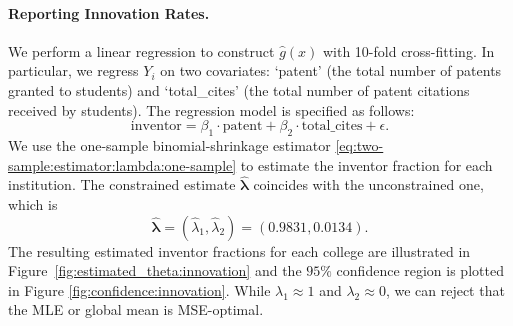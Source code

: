 \documentclass[12pt,letterpaper]{article}
\begin{document}
\paragraph{Reporting Innovation Rates.} %
We perform a linear regression to construct $\hat{g}(x)$ with 10-fold cross-fitting. In particular, we regress $Y_i$ on two covariates: `patent' (the total number of patents granted to students) and `total\_cites' (the total number of patent citations received by students). The regression model is specified as follows:
$$\textrm{inventor}=\beta_1\cdot\textrm{patent}+\beta_2\cdot\textrm{total\_cites}+\epsilon.$$
 We use the one-sample binomial-shrinkage estimator \eqref{eq:two-sample:estimator:lambda:one-sample} to estimate the inventor fraction for each institution. The constrained estimate $\hat{\boldsymbol\lambda}$ coincides with the unconstrained one, which is 
\begin{equation}\label{eq:lambda:innovation}
    \hat{\boldsymbol\lambda}=(\hat{\lambda}_1,\hat{\lambda}_2)=(0.9831, 0.0134).
\end{equation}
The resulting estimated inventor fractions for each college are illustrated in Figure~\ref{fig:estimated_theta:innovation} and the $95\%$ confidence region is plotted in Figure \ref{fig:confidence:innovation}. While $\lambda_1\approx 1$ and $\lambda_2\approx 0$, we can reject that the MLE or global mean is MSE-optimal.  
\end{document}
